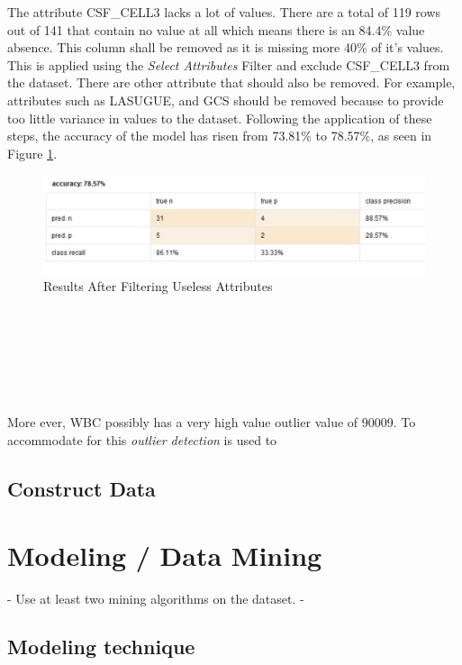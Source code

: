 The attribute CSF\_CELL3 lacks a lot of values. There are a total of 119 rows out of 141 that contain no value at all which means there is an  84.4\% value absence. This column shall be removed as it is missing more 40\% of it's values. This is applied using the \textit{Select Attributes} Filter and exclude CSF\_CELL3 from the dataset. There are other attribute that should also be removed. For example, attributes such as LASUGUE, and GCS should be removed because to provide too little variance in values to the dataset. Following the application of these steps, the accuracy of the model has risen from 73.81\% to 78.57\%, as seen in Figure \ref{filtering}. \\ 
\begin{figure}[ht]
	\begin{center}
		\advance\leftskip-3cm
		\advance\rightskip-3cm
		\includegraphics[keepaspectratio=true,scale=0.6]{__resources/gcsfilter.jpg}
		\caption{Results After Filtering Useless Attributes}
		\label{filtering}
	\end{center}
\end{figure}
\\\\\\\\\\\\
More ever, WBC possibly has a very high value outlier value of 90009. To accommodate for this \textit{outlier detection} is used to 




\subsection*{Construct Data}


\section*{Modeling / Data Mining}

- Use at least two mining algorithms on the dataset. 
- 

\subsection*{Modeling technique}
